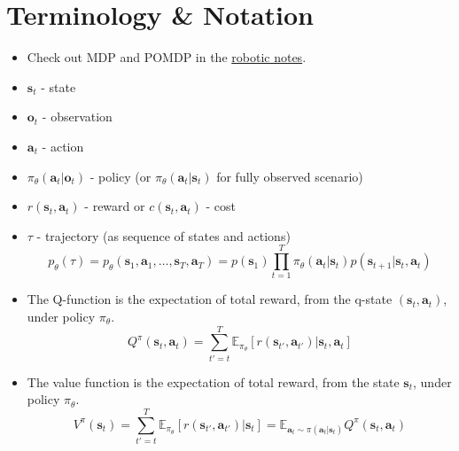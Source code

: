 \section{Terminology \& Notation}
\begin{itemize}
	\item Check out \ac{MDP} and \ac{POMDP} in the \href{robotics.pdf}{robotic notes}.
	\item $\textbf{s}_t$ - state
	\item $\textbf{o}_t$ - observation
	\item $\textbf{a}_t$ - action
	\item $\pi_{\theta}(\textbf{a}_t | \textbf{o}_t)$ - policy (or $\pi_{\theta}(\textbf{a}_t | \textbf{s}_t)$ for fully observed scenario)
	\item $r(\textbf{s}_t, \textbf{a}_t)$ - reward or $c(\textbf{s}_t, \textbf{a}_t)$ - cost
	\item $\tau$ - trajectory (as sequence of states and actions)
	\[ p_\theta(\tau) = p_\theta(\textbf{s}_1, \textbf{a}_1, \dots, \textbf{s}_T, \textbf{a}_T) = p(\textbf{s}_1) \prod_{t=1}^{T} \pi_\theta(\textbf{a}_t | \textbf{s}_t) p(\textbf{s}_{t+1} | \textbf{s}_t, \textbf{a}_t) \]
	\item The Q-function is the expectation of total reward, from the q-state $(\textbf{s}_t, \textbf{a}_t)$, under policy $\pi_\theta$.
	\begin{equation}
		Q^\pi (\textbf{s}_t, \textbf{a}_t) = \sum_{t' = t}^{T} \mathbb{E}_{\pi_\theta} \left[ r(\textbf{s}_{t'}, \textbf{a}_{t'}) | \textbf{s}_t, \textbf{a}_t \right]
	\end{equation}
	\item The value function is the expectation of total reward, from the state $\textbf{s}_t$, under policy $\pi_\theta$.
	\begin{equation}
		V^\pi (\textbf{s}_t) = \sum_{t' = t}^{T} \mathbb{E}_{\pi_\theta} \left[ r(\textbf{s}_{t'}, \textbf{a}_{t'}) | \textbf{s}_t \right] = \mathbb{E}_{\textbf{a}_t \sim \pi(\textbf{a}_t | \textbf{s}_t)} Q^\pi (\textbf{s}_t, \textbf{a}_t)
	\end{equation}
\end{itemize}


